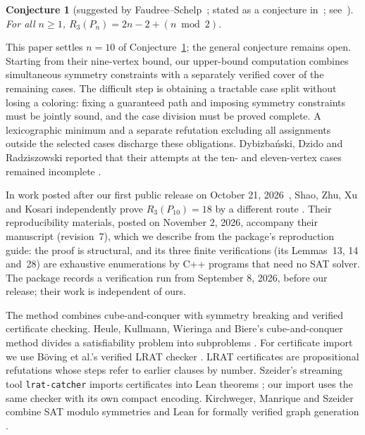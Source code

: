 \documentclass[11pt]{article}
\newtheorem{conjecture}[theorem]{Conjecture}
\theoremstyle{definition}
\theoremstyle{remark}
\newcommand{\R}{R_3}
\begin{document}
\begin{conjecture}[suggested by Faudree--Schelp~\cite{FS75}; stated as a conjecture in~\cite{DDR16}; see~\cite{Rad26}]\label{conj:FS}
For all $n\ge1$, $\R(P_n)=2n-2+(n\bmod 2)$.
\end{conjecture}

This paper settles $n=10$ of Conjecture~\ref{conj:FS}; the general
conjecture remains open. Starting from their nine-vertex bound, our
upper-bound computation combines simultaneous symmetry constraints with
a separately verified cover of the remaining cases. The difficult step is obtaining a tractable case
split without losing a coloring: fixing a guaranteed path and imposing
symmetry constraints must be jointly sound, and the case division must
be proved complete. A lexicographic minimum and a separate refutation
excluding all assignments outside the selected cases discharge these
obligations. Dybizbański, Dzido and Radziszowski reported that their
attempts at the ten- and eleven-vertex cases remained incomplete \cite{DDR16}.

In work posted after our first public release on October 21,
2026~\cite{v1}, Shao, Zhu, Xu and Kosari independently prove
$\R(P_{10})=18$ by a different route \cite{SZXK26}. Their reproducibility
materials, posted on November 2, 2026, accompany their manuscript (revision~7),
which we describe from the package's reproduction guide: the proof is
structural, and its three finite verifications (its Lemmas~13, 14
and~28) are exhaustive enumerations by C++ programs that need no SAT
solver. The package records a verification run from September 8, 2026,
before our release; their work is independent of ours.

The method combines cube-and-conquer with symmetry breaking and verified
certificate checking. Heule, Kullmann, Wieringa and Biere's
cube-and-conquer method divides a satisfiability problem into subproblems
\cite{HKWB12}. For certificate import we use Böving et al.'s verified
LRAT checker \cite{BBC+25}. LRAT certificates are propositional
refutations whose steps refer to earlier clauses by number.
Szeider's streaming tool \texttt{lrat-catcher} imports certificates into
Lean theorems \cite{Sze26}; our import uses the same checker with its own
compact encoding. Kirchweger, Manrique and Szeider combine SAT modulo
symmetries and Lean for formally verified graph generation \cite{KMS26}.
\end{document}
